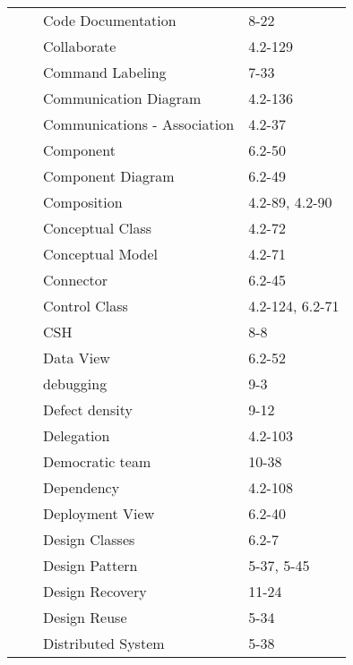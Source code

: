 \documentclass[twocolumn]{article}
\begin{document}
\begin{tabular}{ | >{\bfseries}m{0.5em} | >{\bfseries}m{1em} | m{12em} | m{8em} |}
 &  & Code Documentation & 8-22\\ \cline{3-4}
 &  & Collaborate & 4.2-129\\ \cline{3-4}
 &  & Command Labeling & 7-33\\ \cline{3-4}
 &  & Communication Diagram & 4.2-136\\ \cline{3-4}
 &  & Communications - \newline Association & 4.2-37\\ \cline{3-4}
 &  & Component & 6.2-50\\ \cline{3-4}
 &  & Component Diagram & 6.2-49\\ \cline{3-4}
 &  & Composition & 4.2-89, 4.2-90\\ \cline{3-4}
 &  & Conceptual Class & 4.2-72\\ \cline{3-4}
 &  & Conceptual Model & 4.2-71\\ \cline{3-4}
 &  & Connector & 6.2-45\\ \cline{3-4}
 &  & Control Class & 4.2-124, 6.2-71\\ \cline{3-4}
 &  & CSH & 8-8\\ \cline{2-4}
 & \multirow{13}{1em}{D \newline  \newline  \newline  \newline  \newline D \newline  \newline  \newline  \newline  \newline D} & Data View & 6.2-52\\ \cline{3-4}
 &  & debugging & 9-3\\ \cline{3-4}
 &  & Defect density & 9-12\\ \cline{3-4}
 &  & Delegation & 4.2-103\\ \cline{3-4}
 &  & Democratic team & 10-38\\ \cline{3-4}
 &  & Dependency & 4.2-108\\ \cline{3-4}
 &  & Deployment View & 6.2-40\\ \cline{3-4}
 &  & Design Classes & 6.2-7\\ \cline{3-4}
 &  & Design Pattern & 5-37, 5-45\\ \cline{3-4}
 &  & Design Recovery & 11-24\\ \cline{3-4}
 &  & Design Reuse & 5-34\\ \cline{3-4}
 &  & Distributed System & 5-38\\ \cline{3-4}

\end{tabular}
\end{document}
